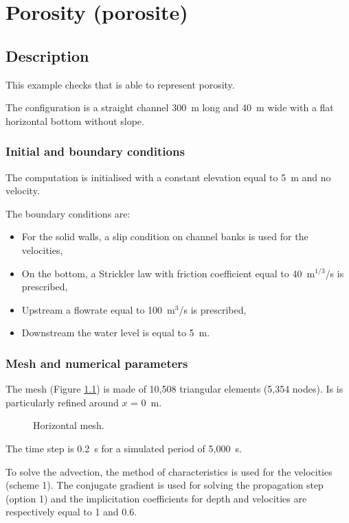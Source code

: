 \chapter{Porosity (porosite)}

\section{Description}

This example checks that  is able to represent porosity.

The configuration is a straight channel 300~m long and 40~m wide
with a flat horizontal bottom without slope.

\subsection{Initial and boundary conditions}

The computation is initialised with a constant elevation equal to 5~m
and no velocity.

The boundary conditions are:
\begin{itemize}
\item For the solid walls, a slip condition on channel banks is used for the
velocities,
\item On the bottom, a Strickler law with friction coefficient equal to
40~m$^{1/3}$/s is prescribed,
\item Upstream a flowrate equal to 100~m$^3$/s is prescribed,
\item Downstream the water level is equal to 5~m.
\end{itemize}

\subsection{Mesh and numerical parameters}

The mesh (Figure \ref{t2d:porosite:fig:meshH})
is made of 10,508 triangular elements (5,354 nodes).
Is is particularly refined around $x$ = 0~m.

\begin{figure}[!htbp]
 \centering
 \caption{Horizontal mesh.}
 \label{t2d:porosite:fig:meshH}
\end{figure}

The time step is 0.2~s for a simulated period of 5,000~s.

To solve the advection, the method of characteristics
is used for the velocities (scheme 1).
The conjugate gradient
is used for solving the propagation step (option 1) and
the implicitation coefficients
for depth and velocities are respectively equal to 1 and 0.6.

